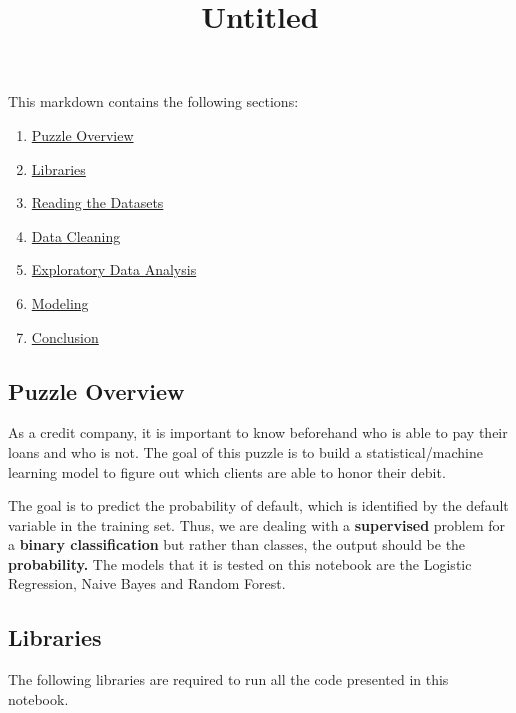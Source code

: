 \documentclass[]{article}
\title{Untitled}
\author{}
\date{}
\providecommand{\tightlist}{%
  \setlength{\itemsep}{0pt}\setlength{\parskip}{0pt}}
\begin{document}
\maketitle

This markdown contains the following sections:

\begin{enumerate}
\def\labelenumi{\arabic{enumi}.}
\tightlist
\item
  \protect\hyperlink{puzzel-overview}{Puzzle Overview}
\item
  \protect\hyperlink{libraries}{Libraries}
\item
  \protect\hyperlink{reading-the-datasets}{Reading the Datasets}
\item
  \protect\hyperlink{data-cleaning}{Data Cleaning}
\item
  \protect\hyperlink{exploratory-data-analysis}{Exploratory Data
  Analysis}
\item
  \protect\hyperlink{modeling}{Modeling}
\item
  \protect\hyperlink{conclusion}{Conclusion}
\end{enumerate}

\subsection{Puzzle Overview}\label{puzzle-overview}

As a credit company, it is important to know beforehand who is able to
pay their loans and who is not. The goal of this puzzle is to build a
statistical/machine learning model to figure out which clients are able
to honor their debit.

The goal is to predict the probability of default, which is identified
by the default variable in the training set. Thus, we are dealing with a
\textbf{supervised} problem for a \textbf{binary classification} but
rather than classes, the output should be the \textbf{probability.} The
models that it is tested on this notebook are the Logistic Regression,
Naive Bayes and Random Forest.

\hypertarget{libraries}{\subsection{Libraries}\label{libraries}}

The following libraries are required to run all the code presented in
this notebook.
\end{document}
